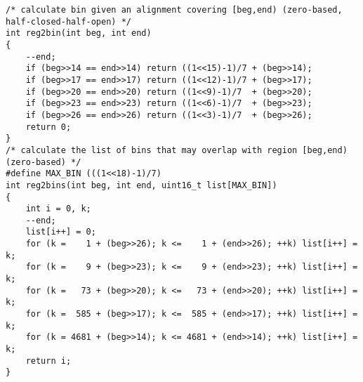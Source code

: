 \documentclass[10pt]{article}
\begin{document}
{\small
\begin{verbatim}
/* calculate bin given an alignment covering [beg,end) (zero-based, half-closed-half-open) */
int reg2bin(int beg, int end)
{
    --end;
    if (beg>>14 == end>>14) return ((1<<15)-1)/7 + (beg>>14);
    if (beg>>17 == end>>17) return ((1<<12)-1)/7 + (beg>>17);
    if (beg>>20 == end>>20) return ((1<<9)-1)/7  + (beg>>20);
    if (beg>>23 == end>>23) return ((1<<6)-1)/7  + (beg>>23);
    if (beg>>26 == end>>26) return ((1<<3)-1)/7  + (beg>>26);
    return 0;
}
/* calculate the list of bins that may overlap with region [beg,end) (zero-based) */
#define MAX_BIN (((1<<18)-1)/7)
int reg2bins(int beg, int end, uint16_t list[MAX_BIN])
{
    int i = 0, k;
    --end;
    list[i++] = 0;
    for (k =    1 + (beg>>26); k <=    1 + (end>>26); ++k) list[i++] = k;
    for (k =    9 + (beg>>23); k <=    9 + (end>>23); ++k) list[i++] = k;
    for (k =   73 + (beg>>20); k <=   73 + (end>>20); ++k) list[i++] = k;
    for (k =  585 + (beg>>17); k <=  585 + (end>>17); ++k) list[i++] = k;
    for (k = 4681 + (beg>>14); k <= 4681 + (end>>14); ++k) list[i++] = k;
    return i;
}
\end{verbatim}
}
\end{document}

